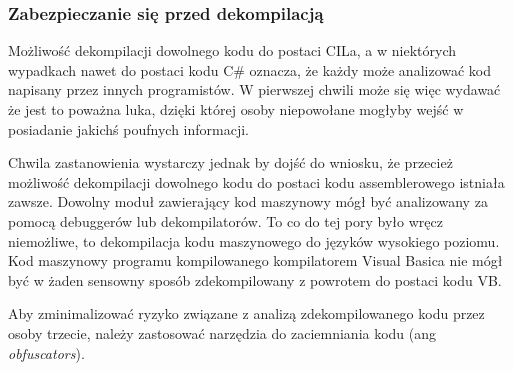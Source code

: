 \subsubsection{Zabezpieczanie się przed dekompilacją}

Możliwość dekompilacji dowolnego kodu do postaci CILa, a w niektórych wypadkach nawet do postaci kodu C\# 
oznacza, że każdy może analizować kod napisany przez innych programistów. W pierwszej chwili może się więc
wydawać że jest to poważna luka, dzięki której osoby niepowołane mogłyby wejść w posiadanie jakichś
poufnych informacji.

Chwila zastanowienia wystarczy jednak by dojść do wniosku, że przecież możliwość dekompilacji dowolnego kodu
do postaci kodu assemblerowego istniała zawsze. Dowolny moduł zawierający kod maszynowy mógł być analizowany
za pomocą debuggerów lub dekompilatorów. To co do tej pory było wręcz niemożliwe, to dekompilacja 
kodu maszynowego do języków wysokiego poziomu. Kod maszynowy programu kompilowanego kompilatorem Visual Basica
nie mógł być w żaden sensowny sposób zdekompilowany z powrotem do postaci kodu VB.

Aby zminimalizować ryzyko związane z analizą zdekompilowanego kodu przez osoby trzecie, należy zastosować
narzędzia do zaciemniania kodu (ang {\em obfuscators}). 

